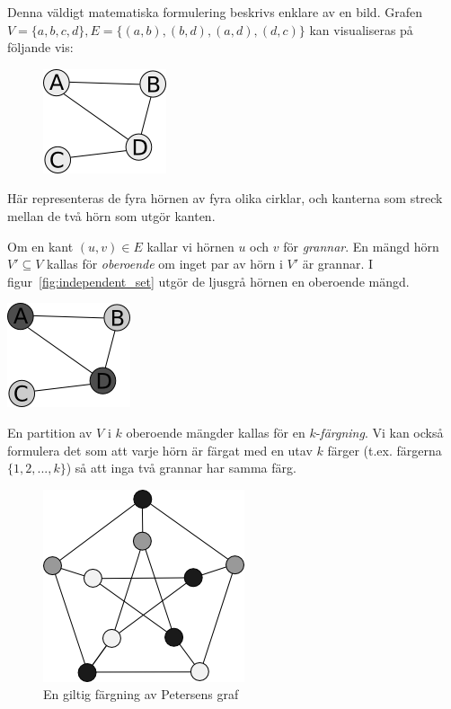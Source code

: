 \documentclass[a4paper]{report}
\begin{document}
Denna väldigt matematiska formulering beskrivs enklare av en bild. Grafen $V = \{a, b, c, d\}, E = \{(a, b), (b, d), (a, d), (d, c)\}$ kan visualiseras på följande vis:

\begin{figure}[h]
    \centering
    \includegraphics{graf.png}
\end{figure}

Här representeras de fyra hörnen av fyra olika cirklar, och kanterna som streck mellan de två hörn som utgör kanten.

Om en kant $(u, v) \in E$ kallar vi hörnen $u$ och $v$ för \emph{grannar}. En mängd hörn $V' \subseteq V$ kallas för \emph{oberoende} om inget par av hörn i $V'$ är grannar. I figur~\ref{fig:independent_set} utgör de ljusgrå hörnen en oberoende mängd.

\begin{center}
    \centering
    \includegraphics{oberoende_graf.png}
\label{fig:independent_set}
\end{center}

En partition av $V$ i $k$ oberoende mängder kallas för en $k$-\emph{färgning}. Vi kan också formulera det som att varje hörn är färgat
med en utav $k$ färger (t.ex. färgerna $\{1, 2, ..., k\}$) så att inga två grannar har samma färg.

\begin{figure}[h!]
\centering
\includegraphics{giltig_petersen}
\caption{En giltig färgning av Petersens graf }
\label{fig:petersen_coloring}
\end{figure}
\end{document}
